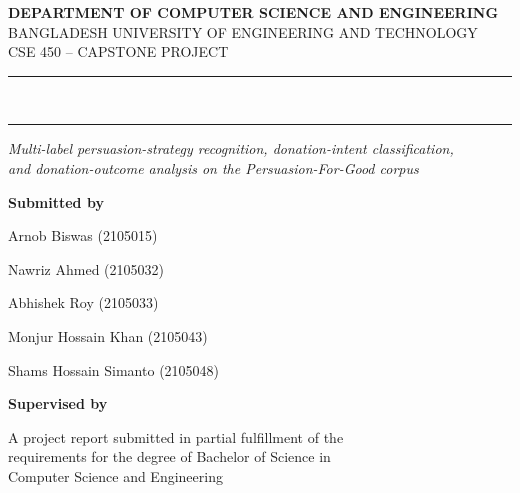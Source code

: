 \begin{titlepage}
\singlespacing
\centering
\vspace*{0.3cm}

{\large \bfseries DEPARTMENT OF COMPUTER SCIENCE AND ENGINEERING}\\[2pt]
{\large BANGLADESH UNIVERSITY OF ENGINEERING AND TECHNOLOGY}\\[8pt]
{\large CSE 450 -- CAPSTONE PROJECT}

\vspace{1.0cm}
\rule{0.85\textwidth}{0.6pt}\\[14pt]
{\LARGE \bfseries \color{cseblue} \ProjectTitle \par}
\vspace{10pt}
\rule{0.85\textwidth}{0.6pt}

\vspace{0.9cm}
{\large \itshape Multi-label persuasion-strategy recognition, donation-intent classification,\\
and donation-outcome analysis on the Persuasion-For-Good corpus}

\vspace{1.2cm}
{\large \bfseries Submitted by}\\[8pt]
\begin{teammembers}
\item Arnob Biswas \hfill \textnormal{(2105015)}
\item Nawriz Ahmed \hfill \textnormal{(2105032)}
\item Abhishek Roy \hfill \textnormal{(2105033)}
\item Monjur Hossain Khan \hfill \textnormal{(2105043)}
\item Shams Hossain Simanto \hfill \textnormal{(2105048)}
\end{teammembers}

\vspace{1.0cm}
{\large \bfseries Supervised by}\\[8pt]
{\large \Supervisors}

\vspace{1.2cm}
{\normalsize A project report submitted in partial fulfillment of the\\
requirements for the degree of Bachelor of Science in\\
Computer Science and Engineering}

\vspace{0.9cm}
{\normalsize \Session\\ \SubmissionDate}

\vfill
\end{titlepage}
